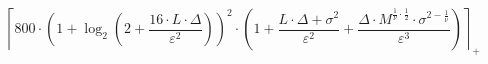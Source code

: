\[\left\lceil 800 \cdot \left(1 + \log_{2}\left(2 + \frac{16 \cdot L \cdot \Delta}{\varepsilon^{2}}\right)\right)^{2} \cdot \left(1 + \frac{L \cdot \Delta + \sigma^{2}}{\varepsilon^{2}} + \frac{\Delta \cdot M^{\frac{1}{\nu} \cdot \frac{1}{2}} \cdot \sigma^{2 - \frac{1}{\nu}}}{\varepsilon^{3}}\right) \right\rceil_{+}\]
